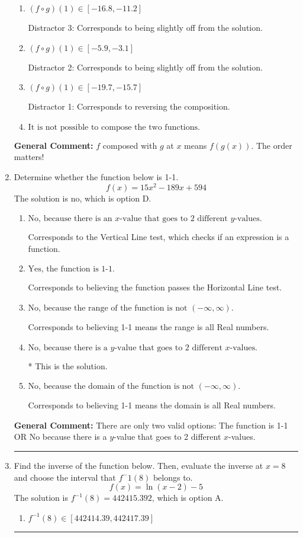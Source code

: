 \documentclass{extbook}[14pt]
\newcommand{\litem}[1]{\item #1

\rule{\textwidth}{0.4pt}}
\begin{document}
\begin{enumerate}
{\begin{enumerate}[label=\Alph*.]
* This is the correct solution
\item \( (f \circ g)(1) \in [-16.8, -11.2] \)

 Distractor 3: Corresponds to being slightly off from the solution.
\item \( (f \circ g)(1) \in [-5.9, -3.1] \)

 Distractor 2: Corresponds to being slightly off from the solution.
\item \( (f \circ g)(1) \in [-19.7, -15.7] \)

 Distractor 1: Corresponds to reversing the composition.
\item \( \text{It is not possible to compose the two functions.} \)


\end{enumerate}

\textbf{General Comment:} $f$ composed with $g$ at $x$ means $f(g(x))$. The order matters!
}
\litem{
Determine whether the function below is 1-1.
\[ f(x) = 15 x^2 - 189 x + 594 \]The solution is \( \text{no} \), which is option D.\begin{enumerate}[label=\Alph*.]
\item \( \text{No, because there is an $x$-value that goes to 2 different $y$-values.} \)

Corresponds to the Vertical Line test, which checks if an expression is a function.
\item \( \text{Yes, the function is 1-1.} \)

Corresponds to believing the function passes the Horizontal Line test.
\item \( \text{No, because the range of the function is not $(-\infty, \infty)$.} \)

Corresponds to believing 1-1 means the range is all Real numbers.
\item \( \text{No, because there is a $y$-value that goes to 2 different $x$-values.} \)

* This is the solution.
\item \( \text{No, because the domain of the function is not $(-\infty, \infty)$.} \)

Corresponds to believing 1-1 means the domain is all Real numbers.
\end{enumerate}

\textbf{General Comment:} There are only two valid options: The function is 1-1 OR No because there is a $y$-value that goes to 2 different $x$-values.
}
\litem{
Find the inverse of the function below. Then, evaluate the inverse at $x = 8$ and choose the interval that $f^-1(8)$ belongs to.
\[ f(x) = \ln{(x-2)}-5 \]The solution is \( f^{-1}(8) = 442415.392 \), which is option A.\begin{enumerate}[label=\Alph*.]
\item \( f^{-1}(8) \in [442414.39, 442417.39] \)


\end{enumerate}}
\end{enumerate}
\end{document}
